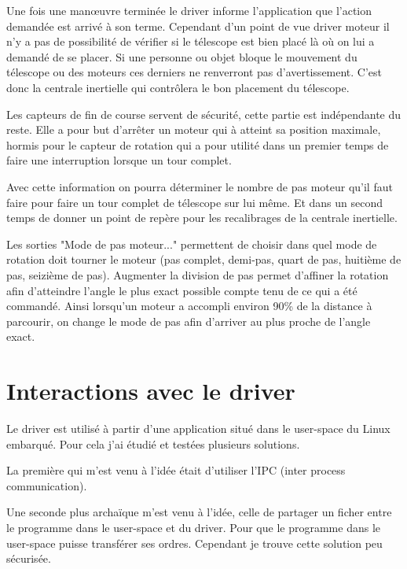 \vspace{1cm}

Une fois une manœuvre terminée le driver informe l'application que l'action demandée est arrivé à son terme. Cependant d'un point de vue driver moteur il n'y a pas de possibilité de vérifier si le télescope est bien placé là où on lui a demandé de se placer. Si une personne ou objet bloque le mouvement du télescope ou des moteurs ces derniers ne renverront pas d'avertissement. C'est donc la centrale inertielle qui contrôlera le bon placement du télescope.

\vspace{1cm}

Les capteurs de fin de course servent de sécurité, cette partie est indépendante du reste. Elle a pour but d'arrêter un moteur qui à atteint sa position maximale, hormis pour le capteur de rotation qui a pour utilité dans un premier temps de faire une interruption lorsque un tour complet.

Avec cette information on pourra déterminer le nombre de pas moteur qu'il faut faire pour faire un tour complet de télescope sur lui même. Et dans un second temps de donner un point de repère pour les recalibrages de la centrale inertielle.

\vspace{1cm}

Les sorties "Mode de pas moteur..." permettent de choisir dans quel mode de rotation doit tourner le moteur (pas complet, demi-pas, quart de pas, huitième de pas, seizième de pas). Augmenter la division de pas permet d'affiner la rotation afin d'atteindre l'angle le plus exact possible compte tenu de ce qui a été commandé. Ainsi lorsqu'un moteur a accompli environ 90\% de la distance à parcourir, on change le mode de pas afin d'arriver au plus proche de l'angle exact.

\section{Interactions avec le driver}

Le driver est utilisé à partir d'une application situé dans le user-space du Linux embarqué. Pour cela j'ai étudié et testées plusieurs solutions.

La première qui m'est venu à l'idée était d'utiliser l'IPC (inter process communication).

Une seconde plus archaïque m'est venu à l'idée, celle de partager un ficher entre le programme dans le user-space et du driver. Pour que le programme dans le user-space puisse transférer ses ordres. Cependant je trouve cette solution peu sécurisée.

